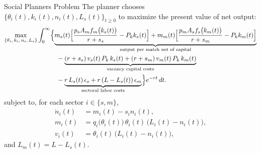 \documentclass[9pt,xcolor={svgnames}]{beamer}
\begin{document}
\begin{frame}{Social Planners Problem}
The planner chooses $\{ \theta_i(t), k_i(t), n_i(t), L_s(t) \}_{t \ge 0}$ to maximize the present value of net output:
{\footnotesize
    \begin{align}
\max_{\{\theta_i,\,k_i,\,n_i,\,L_s\}}
&\int_{0}^{\infty}
\Bigl\{
\underbrace{%
m_s(t)\Bigl[\frac{p_sA_m f_m\bigl(k_s(t)\bigr)}{r+s_s} - P_k k_s(t) \Bigr]
+
m_m(t)\Bigl[\frac{p_mA_s f_s\bigl(k_m(t)\bigr)}{r+s_m} - P_k k_m(t) \Bigr]}_{%
\text{output per match net of capital}}
\nonumber\\
&\hspace{3em}
-\underbrace{%
(r+s_s)\,v_s(t)\,P_k\,k_s(t)
+
(r+s_m)\,v_m(t)\,P_k\,k_m(t)}_{%
\text{vacancy capital costs}}
\nonumber\\
&\hspace{3em}
-\underbrace{%
r\,L_s(t)\,\epsilon_s
+
r\,(L - L_s(t))\,\epsilon_m}_{%
\text{sectoral labor costs}}
\Bigr\}
e^{-rt}\,dt.
\label{eq:SPP_AS_two_sectors_objective_underbrace}
\end{align}
subject to, for each sector $i \in \{s,m\}$,
\begin{align}
    \dot{n}_i(t) & = m_i(t) - s_i n_i(t), \label{eq:ni_law_motion}\\
    m_i(t) & = q_i\bigl(\theta_i(t)\bigr)\,\theta_i(t)\,\bigl(L_i(t) - n_i(t)\bigr), \label{eq:mi_def}\\
    v_i(t) & = \theta_i(t)\,\bigl(L_i(t) - n_i(t)\bigr), \label{eq:vi_def}
\end{align}
and $L_m(t) = L - L_s(t)$.
}
\end{frame}
\end{document}
